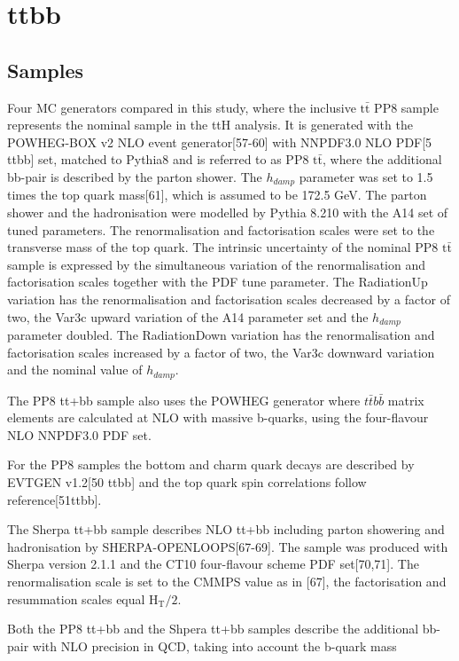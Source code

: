 \section{ttbb}
\label{sec:ttbb}

\subsection{Samples}
Four MC generators compared in this study, where the inclusive $\mathrm{t\bar{t}}$ PP8 sample represents the nominal sample in the ttH analysis. It is generated with the POWHEG-BOX v2 NLO event generator[57-60] with NNPDF3.0 NLO PDF[5 ttbb] set, matched to Pythia8 and is referred to as PP8 $\mathrm{t\bar{t}}$, where the additional bb-pair is described by the parton shower. The $h_{damp}$ parameter was set to 1.5 times the top quark mass[61], which is assumed to be 172.5 GeV. The parton shower and the hadronisation were modelled by Pythia 8.210 with the A14 set of tuned parameters. The renormalisation and factorisation scales were set to the transverse mass of the top quark.
The intrinsic uncertainty of the nominal PP8 $\mathrm{t\bar{t}}$ sample is expressed by the simultaneous variation of the renormalisation and factorisation scales together with the PDF tune parameter. The RadiationUp variation has the renormalisation and factorisation scales decreased by a factor of two, the Var3c upward variation of the A14 parameter set and the $h_{damp}$ parameter doubled. The RadiationDown variation has the renormalisation and factorisation scales increased by a factor of two, the Var3c downward variation and the nominal value of $h_{damp}$.

The PP8 tt+bb sample also uses the POWHEG generator where $t\bar{t}b\bar{b}$ matrix elements are calculated at NLO with massive b-quarks, using the four-flavour NLO NNPDF3.0 PDF set.

For the PP8 samples the bottom and charm quark decays are described by EVTGEN v1.2[50 ttbb] and the top quark spin correlations follow reference[51ttbb].

The Sherpa tt+bb sample describes NLO tt+bb including parton showering and hadronisation by SHERPA-OPENLOOPS[67-69]. The sample was produced with Sherpa version 2.1.1 and the CT10 four-flavour scheme PDF set[70,71]. The renormalisation scale is set to the CMMPS value as in [67], the factorisation and resummation scales equal $\mathrm{H_T/2}$.

Both the PP8 tt+bb and the Shpera tt+bb samples describe the additional bb-pair with NLO precision in QCD, taking into account the b-quark mass

